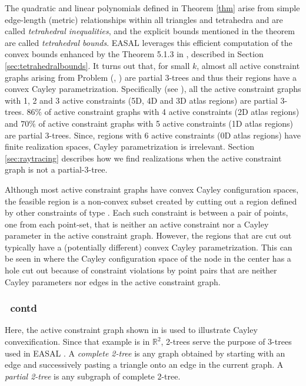 The quadratic and linear polynomials defined in Theorem \ref{thm} arise from
simple edge-length (metric) relationships within all triangles and tetrahedra
and are called \emph{tetrahedral inequalities}, and the explicit bounds
mentioned in the theorem are called \emph{tetrahedral bounds}. EASAL leverages
this efficient computation of the convex bounds enhanced by the Theorem 5.1.3
in \cite{ugandhar}, described in Section \ref{sec:tetrahedralbounds}.  It turns
out that, for small $k$, almost all active constraint graphs arising from
Problem (\cone, \ctwo) are partial 3-trees and thus their regions have a convex
Cayley parametrization. Specifically (see ), all the active
constraint graphs with 1, 2 and 3 active constraints (5D, 4D and 3D atlas
regions) are partial 3-trees. $86\%$ of active constraint graphs with 4 active
constraints (2D atlas regions) and $70\%$ of active constraint graphs with 5
active constraints (1D atlas regions) are partial 3-trees. Since, regions with 6
active constraints (0D atlas regions) have finite realization spaces, Cayley
parametrization is irrelevant. Section \ref{sec:raytracing} describes how we
find realizations when the active constraint graph is not a partial-3-tree.


Although most active constraint graphs have convex Cayley configuration spaces,
the feasible region is a non-convex subset created by cutting out a region
defined by other constraints of type \cone. Each such constraint is between a
pair of points, one from each point-set, that is neither an active constraint
nor a Cayley parameter in the active constraint graph. However, the regions
that are cut out typically have a (potentially different) convex Cayley
parametrization. This can be seen in  where the Cayley
configuration space of the node in the center has a hole cut out because of
constraint violations by point pairs that are neither Cayley parameters nor
edges in the active constraint graph.


\subsubsection{\toytwod\ contd}
Here, the active constraint graph shown in  is used to
illustrate Cayley convexification. Since that example is in $\mathbb{R}^2$,
2-trees serve the purpose of 3-trees used in EASAL \cite{SiGa:2010}. A
\emph{complete 2-tree} is any graph obtained by starting with an edge and
successively pasting a triangle onto an edge in the current graph. A
\emph{partial 2-tree} is any subgraph of complete 2-tree.


